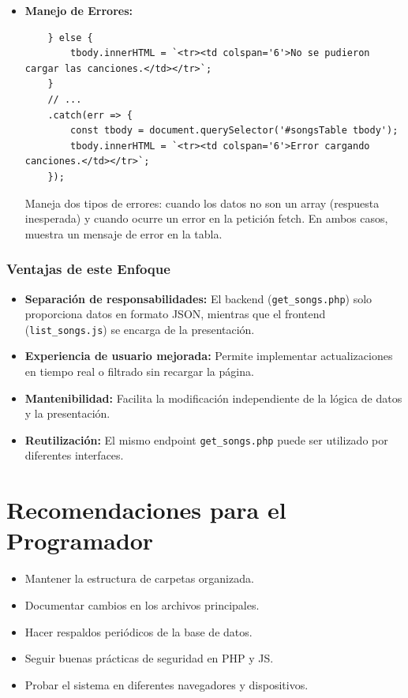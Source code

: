 \documentclass[a4paper,12pt]{article}
\begin{document}
\begin{itemize}
    \item \textbf{Manejo de Errores:}
    \begin{verbatim}
    } else {
        tbody.innerHTML = `<tr><td colspan='6'>No se pudieron cargar las canciones.</td></tr>`;
    }
    // ...
    .catch(err => {
        const tbody = document.querySelector('#songsTable tbody');
        tbody.innerHTML = `<tr><td colspan='6'>Error cargando canciones.</td></tr>`;
    });
    \end{verbatim}
    Maneja dos tipos de errores: cuando los datos no son un array (respuesta inesperada) y cuando ocurre un error en la petición fetch. En ambos casos, muestra un mensaje de error en la tabla.
\end{itemize}

\subsubsection{Ventajas de este Enfoque}
\begin{itemize}
    \item \textbf{Separación de responsabilidades:} El backend (\texttt{get\_songs.php}) solo proporciona datos en formato JSON, mientras que el frontend (\texttt{list\_songs.js}) se encarga de la presentación.
    
    \item \textbf{Experiencia de usuario mejorada:} Permite implementar actualizaciones en tiempo real o filtrado sin recargar la página.
    
    \item \textbf{Mantenibilidad:} Facilita la modificación independiente de la lógica de datos y la presentación.
    
    \item \textbf{Reutilización:} El mismo endpoint \texttt{get\_songs.php} puede ser utilizado por diferentes interfaces.
\end{itemize}

\section{Recomendaciones para el Programador}
\begin{itemize}
    \item Mantener la estructura de carpetas organizada.
    \item Documentar cambios en los archivos principales.
    \item Hacer respaldos periódicos de la base de datos.
    \item Seguir buenas prácticas de seguridad en PHP y JS.
    \item Probar el sistema en diferentes navegadores y dispositivos.
\end{itemize}
\end{document}
